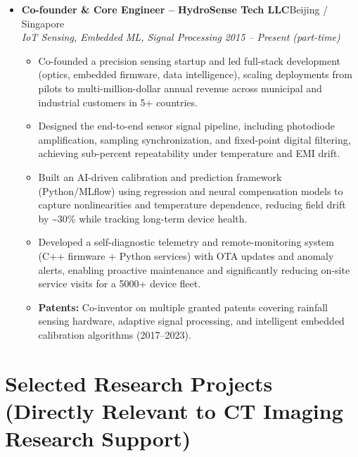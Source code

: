 \documentclass[letterpaper,10pt]{article}
\begin{document}
\begin{itemize}[leftmargin=0in, label={}]
  \vspace{3pt}

  \item
  \textbf{Co-founder \& Core Engineer -- HydroSense Tech LLC}\hfill Beijing / Singapore \\
  \textit{IoT Sensing, Embedded ML, Signal Processing} \hfill \textit{2015 -- Present (part-time)}
  \begin{itemize}[leftmargin=0.2in, topsep=1pt]
    \item Co-founded a precision sensing startup and led full-stack development (optics, embedded firmware, data intelligence), scaling deployments from pilots to multi-million-dollar annual revenue across municipal and industrial customers in 5+ countries.
    \item Designed the end-to-end sensor signal pipeline, including photodiode amplification, sampling synchronization, and fixed-point digital filtering, achieving sub-percent repeatability under temperature and EMI drift.
    \item Built an AI-driven calibration and prediction framework (Python/MLflow) using regression and neural compensation models to capture nonlinearities and temperature dependence, reducing field drift by \textasciitilde30\% while tracking long-term device health.
    \item Developed a self-diagnostic telemetry and remote-monitoring system (C++ firmware + Python services) with OTA updates and anomaly alerts, enabling proactive maintenance and significantly reducing on-site service visits for a 5000+ device fleet.
    \item \textbf{Patents:} Co-inventor on multiple granted patents covering rainfall sensing hardware, adaptive signal processing, and intelligent embedded calibration algorithms (2017--2023).
  \end{itemize}

\end{itemize}

\vspace{-2pt}

\section{Selected Research Projects (Directly Relevant to CT Imaging Research Support)}
\end{document}
